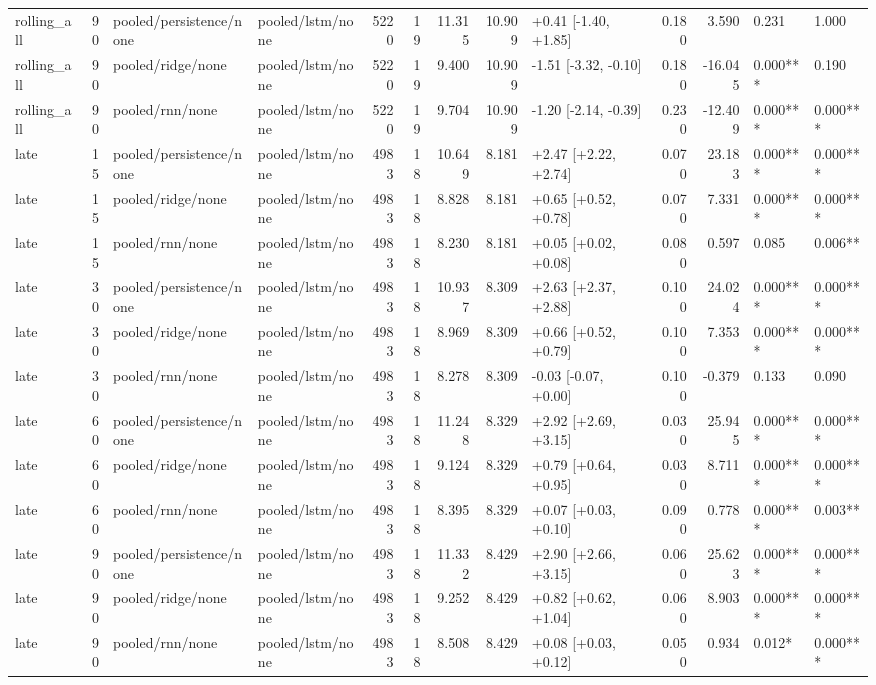 \begin{tabular}{lrllrrrrlrrll}
rolling_all & 90 & pooled/persistence/none & pooled/lstm/none & 5220 & 19 & 11.315 & 10.909 & +0.41 [-1.40, +1.85] & 0.180 & 3.590 & 0.231 & 1.000 \\
rolling_all & 90 & pooled/ridge/none & pooled/lstm/none & 5220 & 19 & 9.400 & 10.909 & -1.51 [-3.32, -0.10] & 0.180 & -16.045 & 0.000*** & 0.190 \\
rolling_all & 90 & pooled/rnn/none & pooled/lstm/none & 5220 & 19 & 9.704 & 10.909 & -1.20 [-2.14, -0.39] & 0.230 & -12.409 & 0.000*** & 0.000*** \\
late & 15 & pooled/persistence/none & pooled/lstm/none & 4983 & 18 & 10.649 & 8.181 & +2.47 [+2.22, +2.74] & 0.070 & 23.183 & 0.000*** & 0.000*** \\
late & 15 & pooled/ridge/none & pooled/lstm/none & 4983 & 18 & 8.828 & 8.181 & +0.65 [+0.52, +0.78] & 0.070 & 7.331 & 0.000*** & 0.000*** \\
late & 15 & pooled/rnn/none & pooled/lstm/none & 4983 & 18 & 8.230 & 8.181 & +0.05 [+0.02, +0.08] & 0.080 & 0.597 & 0.085 & 0.006** \\
late & 30 & pooled/persistence/none & pooled/lstm/none & 4983 & 18 & 10.937 & 8.309 & +2.63 [+2.37, +2.88] & 0.100 & 24.024 & 0.000*** & 0.000*** \\
late & 30 & pooled/ridge/none & pooled/lstm/none & 4983 & 18 & 8.969 & 8.309 & +0.66 [+0.52, +0.79] & 0.100 & 7.353 & 0.000*** & 0.000*** \\
late & 30 & pooled/rnn/none & pooled/lstm/none & 4983 & 18 & 8.278 & 8.309 & -0.03 [-0.07, +0.00] & 0.100 & -0.379 & 0.133 & 0.090 \\
late & 60 & pooled/persistence/none & pooled/lstm/none & 4983 & 18 & 11.248 & 8.329 & +2.92 [+2.69, +3.15] & 0.030 & 25.945 & 0.000*** & 0.000*** \\
late & 60 & pooled/ridge/none & pooled/lstm/none & 4983 & 18 & 9.124 & 8.329 & +0.79 [+0.64, +0.95] & 0.030 & 8.711 & 0.000*** & 0.000*** \\
late & 60 & pooled/rnn/none & pooled/lstm/none & 4983 & 18 & 8.395 & 8.329 & +0.07 [+0.03, +0.10] & 0.090 & 0.778 & 0.000*** & 0.003** \\
late & 90 & pooled/persistence/none & pooled/lstm/none & 4983 & 18 & 11.332 & 8.429 & +2.90 [+2.66, +3.15] & 0.060 & 25.623 & 0.000*** & 0.000*** \\
late & 90 & pooled/ridge/none & pooled/lstm/none & 4983 & 18 & 9.252 & 8.429 & +0.82 [+0.62, +1.04] & 0.060 & 8.903 & 0.000*** & 0.000*** \\
late & 90 & pooled/rnn/none & pooled/lstm/none & 4983 & 18 & 8.508 & 8.429 & +0.08 [+0.03, +0.12] & 0.050 & 0.934 & 0.012* & 0.000*** \\

\end{tabular}

